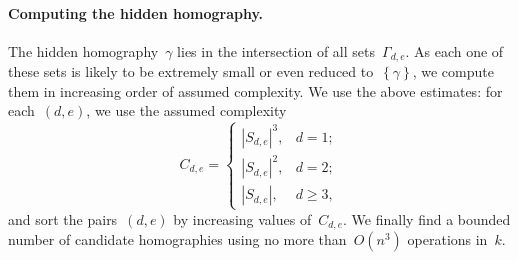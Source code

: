 \documentclass{lms}
\def\acco#1{\left\{#1\right\}}
\def\abs#1{\left|#1\right|}
\def\card#1{\abs{#1}}
\begin{document}
\paragraph{Computing the hidden homography.}

The hidden homography~$γ$ lies in the intersection of all sets~$Γ_{d,e}$.
As each one of these sets is likely to be extremely small or even reduced
to~$\acco{γ}$, we compute them in increasing order of assumed complexity.
We use the above estimates: for each~$(d,e)$, we use the assumed complexity
\begin{equation}
C_{d,e} = \begin{cases}
\card{S_{d,e}}^3,& d = 1;\\
\card{S_{d,e}}^2,& d = 2;\\
\card{S_{d,e}},& d≥ 3,
\end{cases}
\end{equation}
and sort the pairs~$(d,e)$ by increasing values of~$C_{d,e}$. We finally
find a bounded number of candidate homographies using no more
than~$O(n^3)$ operations in~$k$.
\end{document}
